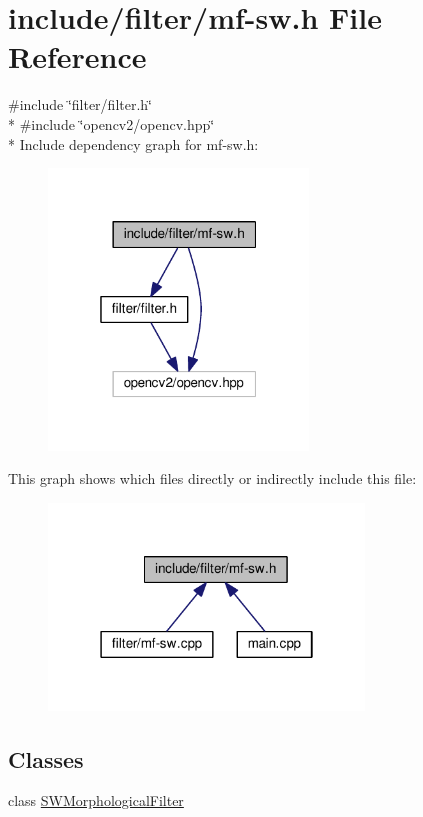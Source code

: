 \hypertarget{mf-sw_8h}{}\section{include/filter/mf-\/sw.h File Reference}
\label{mf-sw_8h}
{\ttfamily \#include \char`\"{}filter/filter.\+h\char`\"{}}\\*
{\ttfamily \#include \char`\"{}opencv2/opencv.\+hpp\char`\"{}}\\*
Include dependency graph for mf-\/sw.h\+:
\nopagebreak
\begin{figure}[H]
\begin{center}
\leavevmode
\includegraphics[width=196pt]{mf-sw_8h__incl}
\end{center}
\end{figure}
This graph shows which files directly or indirectly include this file\+:
\nopagebreak
\begin{figure}[H]
\begin{center}
\leavevmode
\includegraphics[width=238pt]{mf-sw_8h__dep__incl}
\end{center}
\end{figure}
\subsection*{Classes}
\begin{DoxyCompactItemize}
\item 
class \hyperlink{classSWMorphologicalFilter}{S\+W\+Morphological\+Filter}
\end{DoxyCompactItemize}
